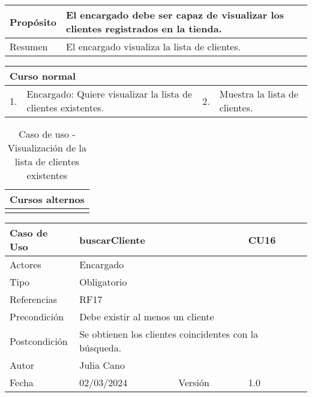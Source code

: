 \begin{table}[H]
	\centering
	\begin{tabular}{| m{} | m{} | m{} | m{} |}
		\hline
		Propósito & \multicolumn{3}{m{0.67\textwidth}|}{El encargado debe ser capaz de visualizar los clientes registrados en la tienda.}  \\ 
		\hline
		Resumen & \multicolumn{3}{m{0.67\textwidth}|}{El encargado visualiza la lista de clientes.} \\ 
		\hline
	\end{tabular}
\end{table}


\begin{table}[H]
	\centering
	\begin{tabular}{| m{} | m{} | m{} | m{} |}
		\hline
		\multicolumn{4}{|m{0.9\textwidth}|}{Curso normal}     \\ 
		\hline
		1. & Encargado: Quiere visualizar la lista de clientes existentes. & 2. &  Muestra la lista de clientes.  \\ 
		\hline
	\end{tabular}
\end{table}

\begin{table}[H]
	\centering
	\begin{tabular}{| m{} | m{} | m{} | m{} |}
		\hline
		\multicolumn{4}{|m{0.9\textwidth}|}{Cursos alternos}     \\ 
		\hline
		& \multicolumn{3}{m{0.67\textwidth}|}{} \\ 
		\hline
	\end{tabular}
	\caption{Caso de uso - Visualización de la lista de clientes existentes}
\end{table}

\newpage


\begin{table}[H]
	\centering
	\begin{tabular}{| m{} | m{} | m{} | m{}|}
		\hline
		\rowcolor{grayshade} Caso de Uso & \multicolumn{2}{|m{0.43\textwidth}|}{buscarCliente} &  CU16\\ 
		\hline
		Actores & \multicolumn{3}{l|}{Encargado} \\ 
		\hline
		Tipo & \multicolumn{3}{l|}{Obligatorio} \\ 
		\hline
		Referencias & \multicolumn{3}{l|}{RF17} \\ 
		\hline
		Precondición & \multicolumn{3}{m{0.67\textwidth}|}{Debe existir al menos un cliente} \\ 
		\hline
		Postcondición & \multicolumn{3}{m{0.67\textwidth}|}{Se obtienen los clientes coincidentes con la búsqueda.} \\ 
		\hline
		Autor & \multicolumn{3}{l|}{Julia Cano} \\ 
		\hline
		Fecha & 02/03/2024 & Versión & 1.0 \\
		\hline
	\end{tabular}
\end{table}

